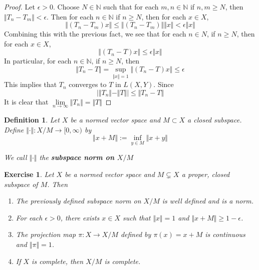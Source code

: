 \documentclass[12pt]{amsart}
\newtheorem{defn}[thm]{Definition}
\newtheorem{ex}[thm]{Exercise}
\newcommand{\ep}{\epsilon}
\newcommand{\N}{\mathbb{N}}
\newcommand{\Rg}{[0,\infty)}
\newcommand{\limn}{\lim \limits_{n \rightarrow \infty}}
\newcommand{\n}{\Vert}
\begin{document}
\begin{proof}
Let $\ep >0 $. Choose $N \in \N$ such that for each $m, n \in \N$ if $n,m \geq N$, then $\n T_n - T_m \n < \ep$. Then for each $n \in \N$ if $n \geq N$, then for each $x \in X$, $$\n (T_n-T_m)x\n \leq \n (T_n-T_m)\n \n x \n < \ep \n x\n$$ Combining this with the previous fact, we see that for each $n \in N$, if $n \geq N$, then for each $x \in X$, $$\n (T_n -T) x\n \leq \ep \n x \n$$ In particular, for each $n \in \N$, if $n \geq N$, then $$ \n T_n -T \n = \sup\limits_{\n x \n = 1}\n (T_n - T)x \n \leq \ep$$ This implies that $T_n$ converges to $T$ in $L(X,Y)$. 
Since $$\big\vert \n T_n \n - \n T \n\big \vert \leq \n T_n - T \n$$ It is clear that $\limn \n T_n \n = \n T \n$
\end{proof}

\begin{defn}
Let $X$ be a normed vector space and $M \subset X$ a closed subspace. Define $\n \cdot\n :X/M \rightarrow \Rg$ by $$\n x+M\n  := \inf_{y \in M}\n x+y\n $$

We call $\n \cdot\n $ the \textbf{subspace norm on $X/M$}
\end{defn}

\begin{ex}
Let $X$ be a normed vector space and $M \subsetneq X$ a proper, closed subspace of $M$. 
Then 
\begin{enumerate}
\item The previously defined subspace norm on $X/M$ is well defined and is a norm. 
\item For each $\ep > 0$, there exists $x \in X$ such that $\n x\n =1$ and $\n x+M\n  \geq 1-\ep$.
\item The projection map $\pi:X \rightarrow X/M$ defined by $\pi(x) = x+M$ is continuous and $\n \pi\n =1$. 
\item If $X$ is complete, then $X/M$ is complete. 
\end{enumerate} 
\end{ex}
\end{document}
